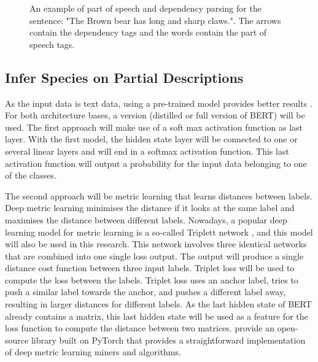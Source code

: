 \documentclass[a4paper, 12pt, oneside]{book} %
\begin{document}
\begin{figure} [t]
    \centering
    \vspace{0cm}
    \makebox[\textwidth][c]{}
    \caption{An example of part of speech and dependency parsing for the sentence: "The Brown bear has long and sharp claws.". The arrows contain the dependency tags and the words contain the part of speech tags.}
    \label{fig:PoS_example}
\end{figure}

\subsection{Infer Species on Partial Descriptions}
As the input data is text data, using a pre-trained model provides better results \autocite{devlin_bert_2019, sanh_distilbert_2020, mikolov_distributed_2013}.
For both architecture bases, a version (distilled or full version of BERT) will be used.
The first approach will make use of a soft max activation function as last layer.
With the first model, the hidden state layer will be connected to one or several linear layers and will end in a softmax activation function.
This last activation function will output a probability for the input data belonging to one of the classes.

The second approach will be metric learning that learns distances between labels.
Deep metric learning minimises the distance if it looks at the same label and maximises the distance between different labels.
Nowadays, a popular deep learning model for metric learning is a so-called Triplett network \autocite{hoffer_deep_2015}, and this model will also be used in this research.
This network involves three identical networks that are combined into one single loss output.
The output will produce a single distance cost function between three input labels.
Triplet loss \autocite{schroff_facenet_2015} will be used to compute the loss between the labels.
Triplet loss uses an anchor label, tries to push a similar label towards the anchor, and pushes a different label away, resulting in larger distances for different labels.
As the last hidden state of BERT already contains a matrix, this last hidden state will be used as a feature for the loss function to compute the distance between two matrices.
\textcite{musgrave_pytorch_2020} provide an open-source library built on PyTorch that provides a straightforward implementation of deep metric learning miners and algorithms.
\end{document}
